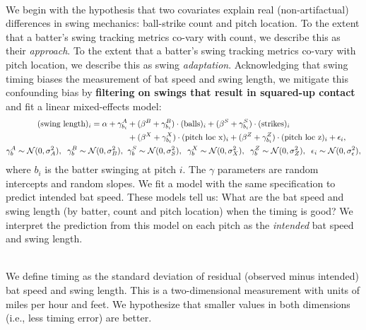 \documentclass{article}
\begin{document}
~\\
We begin with the hypothesis that two covariates explain real (non-artifactual) differences in swing mechanics: ball-strike count and pitch location. To the extent that a batter's swing tracking metrics co-vary with count, we describe this as their {\it approach}. To the extent that a batter's swing tracking metrics co-vary with pitch location, we describe this as swing {\it adaptation}. Acknowledging that swing timing biases the measurement of bat speed and swing length, we mitigate this confounding bias by {\bf filtering on swings that result in squared-up contact} and fit a linear mixed-effects model:
\begin{align}
    \label{eqn:intended-swing-length}
    \begin{split}
    (\mbox{swing length})_i = \alpha + \gamma^A_{b_i}
        & + (\beta^B + \gamma^B_{b_i}) \cdot (\mbox{balls})_i
          + (\beta^S + \gamma^S_{b_i}) \cdot (\mbox{strikes})_i\\
        & + (\beta^X + \gamma^X_{b_i}) \cdot (\mbox{pitch loc x})_i
          + (\beta^Z + \gamma^Z_{b_i}) \cdot (\mbox{pitch loc z})_i
          + \epsilon_i,\\
    \gamma^A_b \sim \mathcal{N}(0, \sigma^2_A), \hspace{2mm}
    \gamma^B_b \sim \mathcal{N}(0, \sigma^2_B), \hspace{2mm}
   &\gamma^S_b \sim \mathcal{N}(0, \sigma^2_S), \hspace{2mm}
    \gamma^X_b \sim \mathcal{N}(0, \sigma^2_X), \hspace{2mm}
    \gamma^Z_b \sim \mathcal{N}(0, \sigma^2_Z), \hspace{2mm}
    \epsilon_i \sim \mathcal{N}(0, \sigma^2_\epsilon),
    \end{split}
\end{align}
where $b_i$ is the batter swinging at pitch $i$. The $\gamma$ parameters are random intercepts and random slopes. We fit a model with the same specification to predict intended bat speed. These models tell us: What are the bat speed and swing length (by batter, count and pitch location) when the timing is good? We interpret the prediction from this model on each pitch as the {\it intended} bat speed and swing length.

~\\
We define timing as the standard deviation of residual (observed minus intended) bat speed and swing length. This is a two-dimensional measurement with units of miles per hour and feet. We hypothesize that smaller values in both dimensions (i.e., less timing error) are better.
\end{document}
